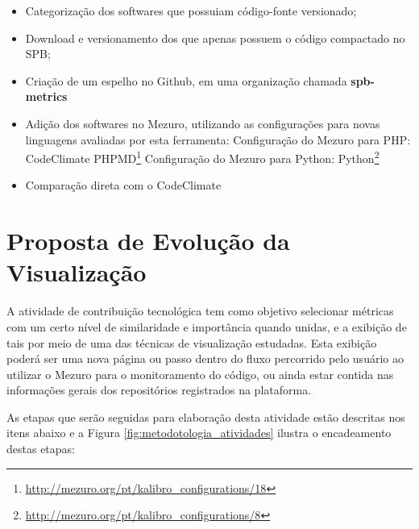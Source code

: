 \begin{itemize}
  \item Categorização dos softwares que possuiam código-fonte versionado;
  \item Download e versionamento dos que apenas possuem o código compactado no SPB;
  \item Criação de um espelho no Github, em uma organização chamada \textbf{spb-metrics}
  \item Adição dos softwares no Mezuro, utilizando as configurações para novas
  linguagens avaliadas por esta ferramenta:
    \subitem Configuração do Mezuro para PHP: CodeClimate PHPMD\footnote{\url{http://mezuro.org/pt/kalibro\_configurations/18}}
    \subitem Configuração do Mezuro para Python: Python\footnote{\url{http://mezuro.org/pt/kalibro\_configurations/8}}
  \item Comparação direta com o CodeClimate
\end{itemize}

\section{Proposta de Evolução da Visualização}

A atividade de contribuição tecnológica tem como objetivo selecionar métricas
com um certo nível  de similaridade e importância quando unidas, e a exibição de
tais por meio de uma das técnicas de visualização estudadas. Esta exibição
poderá ser uma nova página ou passo dentro do fluxo percorrido pelo usuário ao
utilizar o Mezuro para o monitoramento do código, ou ainda estar contida nas
informações gerais dos repositórios registrados na plataforma.

As etapas que serão seguidas para elaboração desta atividade estão descritas
nos itens abaixo e a Figura \ref{fig:metodotologia_atividades} ilustra o
encadeamento destas etapas:

